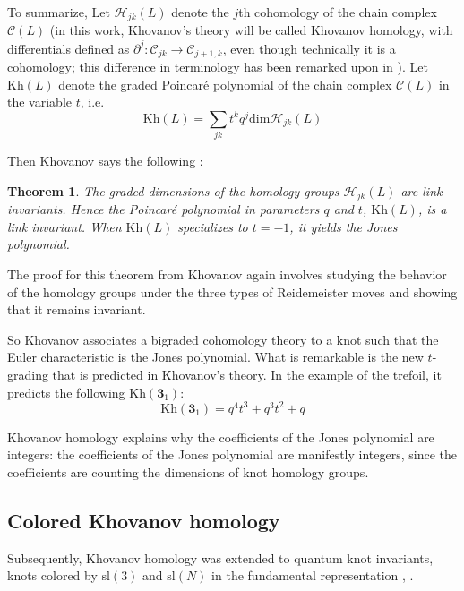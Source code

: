 \documentclass[a4paper,titlepage,twoside]{book}
\newtheorem{theorem}{Theorem}
\begin{document}
To summarize, Let $\mathcal{H}_{jk}{(L)}$ denote the $j$th cohomology of the chain complex $\mathcal{C}{(L)}$ (in this work, Khovanov's theory will be called Khovanov homology, with differentials defined as $\partial^j: \mathcal{C}_{jk} \to \mathcal{C}_{j+1,k}$, even though technically it is a cohomology; this difference in terminology has been remarked upon in \cite{Khovanov2006}).  Let $\text{Kh}{ (L)}$ denote the graded Poincar\'{e} polynomial of the chain complex $\mathcal{C}{(L)}$ in the variable $t$, i.e.  
\begin{equation}
  \text{Kh}{(L)} = \sum_{jk} t^k q^j \text{dim}{ \mathcal{H}_{jk}{ (L)} }
\end{equation}

Then Khovanov says the following \cite{Khovanov2000}:
\begin{theorem}
  The graded dimensions of the homology groups $\mathcal{H}_{jk}{(L)}$ are link invariants.  Hence the Poincar\'{e} polynomial in parameters $q$ and $t$, $\text{Kh}{ (L)}$, is a link invariant.  When $\text{Kh}{(L)}$ specializes to $t=-1$, it yields the Jones polynomial.  
\end{theorem}
The proof for this theorem from Khovanov again involves studying the behavior of the homology groups under the three types of Reidemeister moves and showing that it remains invariant.  

So Khovanov associates a bigraded cohomology theory to a knot such that the Euler characteristic is the Jones polynomial.  What is remarkable is the new $t$-grading that is predicted in Khovanov's theory.  In the example of the trefoil, it predicts the following $\text{Kh}{(\mathbf{3}_1)}$:
\begin{equation}
  \text{Kh}{(\mathbf{3}_1)} = q^{4} t^{3} + q^{3} t^{2} + q
\end{equation}

Khovanov homology explains why the coefficients of the Jones polynomial are integers: the coefficients of the Jones polynomial are manifestly integers, since the coefficients are counting the dimensions of knot homology groups.  
\subsection{Colored Khovanov homology}

Subsequently, Khovanov homology was extended to quantum knot invariants, knots colored by $\text{sl}{(3)}$ and $\text{sl}{(N)}$ in the fundamental representation  \cite{KhovanovRozansky2004}, \cite{Khovanov2003}.
\end{document}
